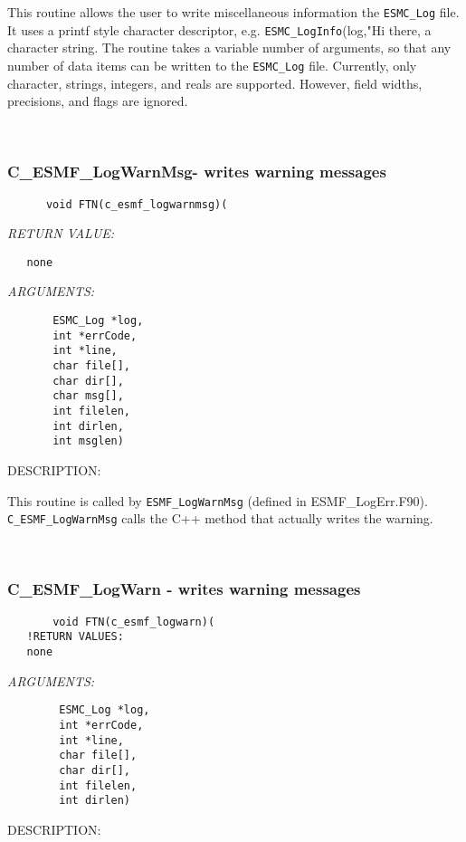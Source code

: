     This routine allows the user to write miscellaneous information the
    {\tt ESMC\_Log} file. It uses a printf style character descriptor, e.g. 
    {\tt ESMC\_LogInfo}(log,"Hi there, %
    a character string. The routine takes a variable number of arguments,
    so that any number of data items can be written to the {\tt ESMC\_Log} file.
    Currently, only character, strings, integers, and reals are supported.
    However, field widths, precisions, and flags are ignored.
   
 
\mbox{}\hrulefill\ 
 
\subsubsection [C\_ESMF\_LogWarnMsg-] {C\_ESMF\_LogWarnMsg- writes warning messages}


  
\begin{verbatim}      void FTN(c_esmf_logwarnmsg)(\end{verbatim}{\em RETURN VALUE:}
\begin{verbatim}   none\end{verbatim}{\em ARGUMENTS:}
\begin{verbatim}       ESMC_Log *log,
       int *errCode,
       int *line,
       char file[],
       char dir[],
       char msg[],
       int filelen,
       int dirlen,
       int msglen)\end{verbatim}
{\sf DESCRIPTION:\\ }


      This routine is called by {\tt ESMF\_LogWarnMsg} (defined in ESMF\_LogErr.F90).  
      {\tt C\_ESMF\_LogWarnMsg} calls the C++ method that actually writes the warning.
   
 
\mbox{}\hrulefill\ 
 
\subsubsection [C\_ESMF\_LogWarn] {C\_ESMF\_LogWarn - writes warning messages}


  
\begin{verbatim}       void FTN(c_esmf_logwarn)(
   !RETURN VALUES:
   none\end{verbatim}{\em ARGUMENTS:}
\begin{verbatim}        ESMC_Log *log,
        int *errCode,
        int *line,
        char file[],
        char dir[],
        int filelen,
        int dirlen)\end{verbatim}
{\sf DESCRIPTION:\\ }



